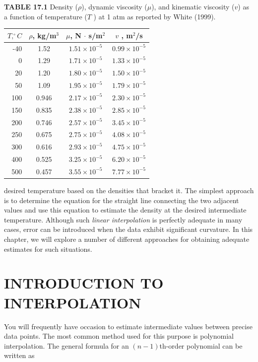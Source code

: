 \documentclass[../main.tex]{subfiles}
\begin{document}

\noindent \textbf{TABLE 17.1} Density ($\rho$), dynamic viscosity ($\mu$), and kinematic viscosity ($v$) as a function of
temperature ($T$ ) at 1 atm as reported by White (1999).

\begin{tabular}{r c c c}
	$T, ^\circ C$ & $\rho$, kg/m$^3$ & $\mu$, N $\cdot$ s/m$^2$ & $v$ , m$^2$/s \\
	\hline
	-40 & 1.52 & $1.51 \times 10^{-5}$ & $0.99 \times 10^{-5}$ \\
	0 & 1.29 & $1.71 \times 10^{-5}$ & $1.33 \times 10^{-5}$ \\
	20 & 1.20 & $1.80 \times 10^{-5}$ & $1.50 \times 10^{-5}$ \\
	50 & 1.09 & $1.95 \times 10^{-5}$ & $1.79 \times 10^{-5}$ \\
	100 & 0.946 & $2.17 \times 10^{-5}$ & $2.30 \times 10^{-5}$ \\
	150 & 0.835 & $2.38 \times 10^{-5}$ & $2.85 \times 10^{-5}$ \\
	200 & 0.746 & $2.57 \times 10^{-5}$ & $3.45 \times 10^{-5}$ \\
	250 & 0.675 & $2.75 \times 10^{-5}$ & $4.08 \times 10^{-5}$ \\
	300 & 0.616 & $2.93 \times 10^{-5}$ & $4.75 \times 10^{-5}$ \\
	400 & 0.525 & $3.25 \times 10^{-5}$ & $6.20 \times 10^{-5}$ \\
	500 & 0.457 & $3.55 \times 10^{-5}$ & $7.77 \times 10^{-5}$ \\
\end{tabular}

\noindent desired temperature based on the densities that bracket it. The simplest approach is to determine the equation for the straight line connecting the two adjacent values and use this
equation to estimate the density at the desired intermediate temperature. Although such
\textit{linear interpolation} is perfectly adequate in many cases, error can be introduced when the
data exhibit significant curvature. In this chapter, we will explore a number of different
approaches for obtaining adequate estimates for such situations.

\label{cha:cha_P_17_1} %
\section{INTRODUCTION TO INTERPOLATION}

\noindent You will frequently have occasion to estimate intermediate values between precise data
points. The most common method used for this purpose is polynomial interpolation. The
general formula for an $(n - 1)$th-order polynomial can be written as
\end{document}
